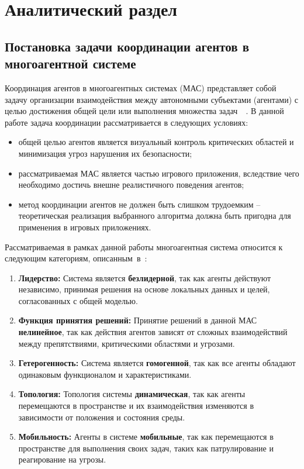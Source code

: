 \chapter{Аналитический раздел}

\iffalse
\section{Постановка задачи координации агентов в многоагентной системе}

Координация агентов в многоагентных системах (МАС) представляет собой задачу организации взаимодействия между автономными субъектами (агентами) с целью достижения общей цели или выполнения множества задач~\cite{wooldridge2009introduction}~\cite{coordination-book}.
В данной работе задача координации рассматривается в следующих условиях:
\begin{itemize}
	\item общей целью агентов является визуальный контроль критических областей и минимизация угроз нарушения их безопасности;
	\item рассматриваемая МАС является частью игрового приложения, вследствие чего необходимо достичь внешне реалистичного поведения агентов;
	\item метод координации агентов не должен быть слишком трудоемким -- теоретическая реализация выбранного алгоритма должна быть пригодна для применения в игровых приложениях.
\end{itemize}

Рассматриваемая в рамках данной работы многоагентная система относится к следующим категориям, описанным~в~\cite{ieee-mas}:
\begin{enumerate}
	\item \textbf{Лидерство:}  
	Система является \textbf{безлидерной}, так как агенты действуют независимо, принимая решения на основе локальных данных и целей, согласованных с общей моделью.
	
	\item \textbf{Функция принятия решений:}  
	Принятие решений в данной МАС \textbf{нелинейное}, так как действия агентов зависят от сложных взаимодействий между препятствиями, критическими областями и угрозами.
	
	\item \textbf{Гетерогенность:}  
	Система является \textbf{гомогенной}, так как все агенты обладают одинаковым функционалом и характеристиками.
	
	\item \textbf{Топология:}  
	Топология системы \textbf{динамическая}, так как агенты перемещаются в пространстве и их взаимодействия изменяются в зависимости от положения и состояния среды.
	
	\item \textbf{Мобильность:}  
	Агенты в системе \textbf{мобильные}, так как перемещаются в пространстве для выполнения своих задач, таких как патрулирование и реагирование на угрозы.
\end{enumerate}

